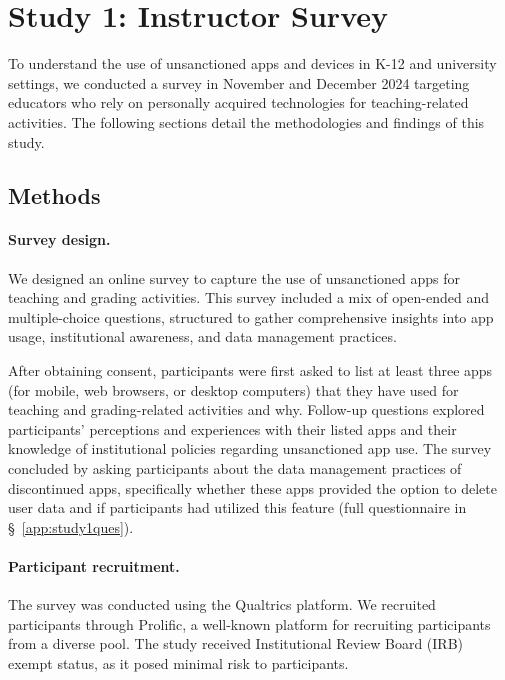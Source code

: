 \section{Study 1: Instructor Survey}

To understand the use of unsanctioned apps and devices in K-12 and university settings, we conducted a survey in November and December 2024 targeting educators who rely on personally acquired technologies for teaching-related activities. The following sections detail the methodologies and findings of this study.

\subsection{Methods}

\paragraph{Survey design.}
We designed an online survey to capture the use of unsanctioned apps for teaching and grading activities. 
This survey included a mix of open-ended and multiple-choice questions, structured to gather comprehensive insights into app usage, institutional awareness, and data management practices.

After obtaining consent, participants were first asked to list at least three apps (for mobile, web browsers, or desktop computers) that they have used for teaching and grading-related activities and why.
Follow-up questions explored participants’ perceptions and experiences with their listed apps and their knowledge of institutional policies regarding unsanctioned app use.
The survey concluded by asking participants about the data management practices of discontinued apps, specifically whether these apps provided the option to delete user data and if participants had utilized this feature %
(full questionnaire in \S~\ref{app:study1ques}).


\paragraph{Participant recruitment.}
The survey was conducted using the Qualtrics \cite{Qualtrics} platform. We recruited participants through Prolific, a well-known platform for recruiting participants from a diverse pool. 
The study received Institutional Review Board (IRB) exempt status, as it posed minimal risk to participants. 

